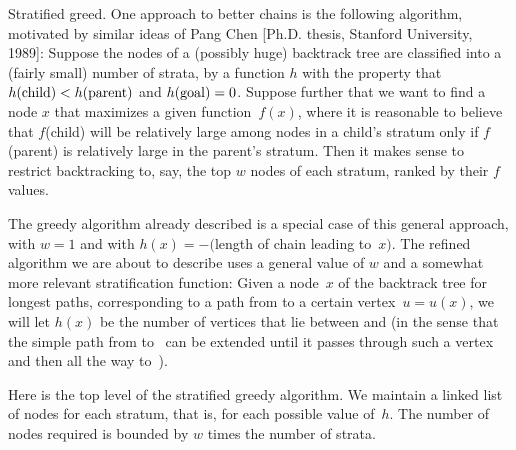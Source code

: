 Stratified greed.  One approach to better chains is the following
algorithm, motivated by similar ideas of Pang Chen [Ph.D. thesis,
Stanford University, 1989]:  Suppose the nodes of
a (possibly huge) backtrack tree are classified into a (fairly small)
number of strata, by a function $h$ with the property that $h({\rm
child})<h({\rm parent})$ and $h({\rm goal})=0$. Suppose further that
we want to find a node $x$ that maximizes a given function~$f(x)$,
where it is reasonable to believe that $f$(child) will be relatively
large among nodes in a child's stratum only if $f$(parent) is
relatively large in the parent's stratum. Then it makes sense to
restrict backtracking to, say, the top $w$ nodes of each stratum,
ranked by their $f$ values.

The greedy algorithm already described is a special case of this general
approach, with $w=1$ and with $h(x)=-($length of chain leading to~$x)$.
The refined algorithm we are about to describe uses a general value of $w$
and a somewhat more relevant stratification function: Given a node~$x$
of the backtrack tree for longest paths, corresponding to a path from
 to a certain vertex~$u=u(x)$, we will let $h(x)$ be the number
of
vertices that lie between  and  (in the sense that the
simple
path from  to~ can be extended until it passes through
such
a vertex and then all the way to~).

Here is the top level of the stratified greedy algorithm. We maintain
a linked list of nodes for each stratum, that is, for each possible value
of~$h$. The number of nodes required is bounded by $w$ times the
number of strata.

